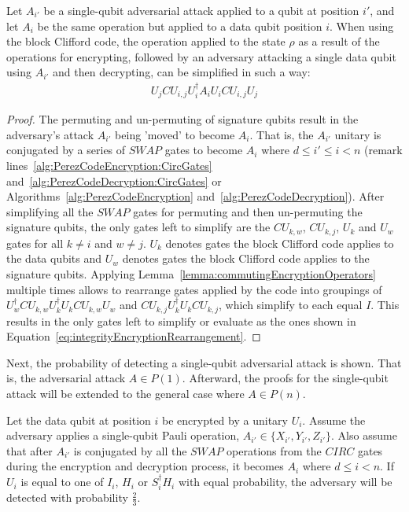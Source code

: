 \begin{myLemmarep}
\label{lemma:integrityEncryptionRearrangement}
Let $A_{i'}$ be a single-qubit adversarial attack applied to a qubit at position $i'$, and let $A_i$ be the same operation but applied to a data qubit position $i$. When using the block Clifford code, the operation applied to the state $\rho$ as a result of the operations for encrypting, followed by an adversary attacking a single data qubit using $A_{i'}$ and then decrypting, can be simplified in such a way:
\begin{align}
U_{j} \mathit{CU}_{i,j}U_i^{\dagger}A_{i}U_i\mathit{CU}_{i,j} U_{j} \label{eq:integrityEncryptionRearrangement}
\end{align}
\end{myLemmarep}
\begin{proof}
The permuting and un-permuting of signature qubits result in the adversary's attack $A_{i'}$ being 'moved' to become $A_i$. That is, the $A_{i'}$ unitary is conjugated by a series of $\mathit{SWAP}$ gates to become $A_{i}$ where $d \leq i' \leq i < n$ (remark lines~\ref{alg:PerezCodeEncryption:CircGates} and~\ref{alg:PerezCodeDecryption:CircGates} or Algorithms~\ref{alg:PerezCodeEncryption} and~\ref{alg:PerezCodeDecryption}). After simplifying all the $\mathit{SWAP}$ gates for permuting and then un-permuting the signature qubits, the only gates left to simplify are the $\mathit{CU}_{k,w}$, $\mathit{CU}_{k,j}$, $U_k$ and $U_w$ gates for all $k \neq i$ and $w \neq j$. $U_k$ denotes gates the block Clifford code applies to the data qubits and $U_w$ denotes gates the block Clifford code applies to the signature qubits. Applying Lemma~\ref{lemma:commutingEncryptionOperators} multiple times allows to rearrange gates applied by the code into groupings of  $U_w^{\dagger}\mathit{CU}_{k,w}U_k^{\dagger}U_k\mathit{CU}_{k,w}U_w$ and $\mathit{CU}_{k,j}U_k^{\dagger}U_k\mathit{CU}_{k,j}$, which simplify to each equal $I$. This results in the only gates left to simplify or evaluate as the ones shown in Equation~\eqref{eq:integrityEncryptionRearrangement}.
\end{proof}
Next, the probability of detecting a single-qubit adversarial attack is shown. That is, the adversarial attack $A \in {P(1)}$. Afterward, the proofs for the single-qubit attack will be extended to the general case where $A \in P(n)$.
\begin{theorem}
\label{theorem:singleQubitAttackOnDataQubit}
Let the data qubit at position $i$ be encrypted by a unitary $U_i$. Assume the adversary applies a single-qubit Pauli operation, $A_{i'} \in \{X_{i'}, Y_{i'}, Z_{i'}\}$. Also assume that after $A_{i'}$ is conjugated by all the $\mathit{SWAP}$ operations from the $\mathit{CIRC}$ gates during the encryption and decryption process, it becomes $A_i$ where $d \leq i < n$. If $U_i$ is equal to one of $I_i$, $H_i$ or $S_i^{\dagger}H_i$ with equal probability, the adversary will be detected with probability $\frac{2}{3}$.
\end{theorem}
